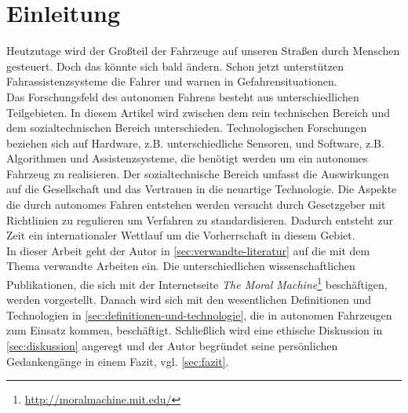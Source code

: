 \section{Einleitung}

Heutzutage wird der Großteil der Fahrzeuge auf unseren Straßen durch Menschen gesteuert. Doch das könnte sich bald ändern. Schon jetzt unterstützen Fahrassistenzsysteme die Fahrer und warnen in Gefahrensituationen.\\

Das Forschungsfeld des autonomen Fahrens besteht aus unterschiedlichen Teilgebieten. In diesem Artikel wird zwischen dem rein technischen Bereich und dem sozialtechnischen Bereich unterschieden. Technologischen Forschungen beziehen sich auf Hardware, z.B. unterschiedliche Sensoren, und Software, z.B. Algorithmen und Assistenzsysteme, die benötigt werden um ein autonomes Fahrzeug zu realisieren. Der sozialtechnische Bereich umfasst die Auswirkungen auf die Gesellschaft und das Vertrauen in die neuartige Technologie. Die Aspekte die durch autonomes Fahren entstehen werden versucht durch Gesetzgeber mit Richtlinien zu regulieren um Verfahren zu standardisieren. Dadurch entsteht zur Zeit ein internationaler Wettlauf um die Vorherrschaft in diesem Gebiet.\\

In dieser Arbeit geht der Autor in \ref{sec:verwandte-literatur} auf die mit dem Thema verwandte Arbeiten ein. Die unterschiedlichen wissenschaftlichen Publikationen, die sich mit der Internetseite \textit{The Moral Machine}\footnote{\url{http://moralmachine.mit.edu/}} beschäftigen, werden vorgestellt. Danach wird sich mit den wesentlichen Definitionen und Technologien in \ref{sec:definitionen-und-technologie}, die in autonomen Fahrzeugen zum Einsatz kommen, beschäftigt. Schließlich wird eine ethische Diskussion in \ref{sec:diskussion} angeregt und der Autor begründet seine persönlichen Gedankengänge in einem Fazit, vgl. \ref{sec:fazit}.